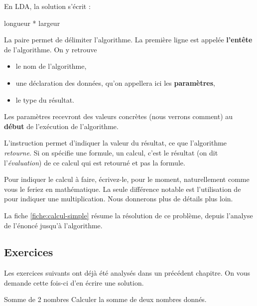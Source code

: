 		En LDA, la solution s'écrit :
		
		\begin{LDA}
				\Return longueur * largeur
			\EndAlgo
		\end{LDA}
	
		La paire \lda{\algorithmicalgo-\algorithmicend\ \algorithmicalgo}
		permet de délimiter l'algorithme.
		La première ligne est appelée 
		\textbf{l'entête} de l'algorithme.
		On y retrouve 
		\begin{itemize}
			\item 
				le nom de l'algorithme,
			\item 
				une déclaration des données, 
				qu’on appellera ici les \textbf{paramètres}, 
			\item 
				le type du résultat.
		\end{itemize}
	
		Les paramètres recevront des valeurs concrètes
		(nous verrons comment)
		au \textbf{début} de l’exécution de l'algorithme. 
	
		L'instruction \lda{\algorithmicreturn}
		permet d'indiquer la valeur du résultat, 
		ce que l'algorithme \emph{retourne}.
		Si on spécifie une formule, un calcul,
		c'est le résultat (on dit l'\emph{évaluation}) 
		de ce calcul qui est retourné et pas la formule.
	
		Pour indiquer le calcul à faire,
		écrivez-le, pour le moment,
		naturellement comme vous le feriez en mathématique.
		La seule différence notable est l'utilisation de \lda{*}
		pour indiquer une multiplication.
		Nous donnerons plus de détails plus loin.
	
		La fiche \vref{fiche:calcul-simple} résume la résolution
		de ce problème, depuis l'analyse de l'énoncé jusqu'à l'algorithme.
	
		\subsection{Exercices}\label{prem-ex-simple}
	
			Les exercices suivants ont déjà été analysés 
			dans un précédent chapitre.
			On vous demande cette fois-ci d'en écrire une solution.
		
			\begin{Exercice}{Somme de 2 nombres}
				Calculer la somme de deux nombres donnés.
			\end{Exercice}
		
